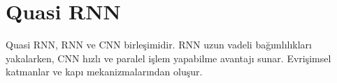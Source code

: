 \section{Quasi RNN}
Quasi RNN, RNN ve CNN birleşimidir. RNN uzun vadeli bağımlılıkları yakalarken, CNN hızlı ve paralel işlem yapabilme avantajı sunar. Evrişimsel katmanlar ve kapı mekanizmalarından oluşur. 

\newpage